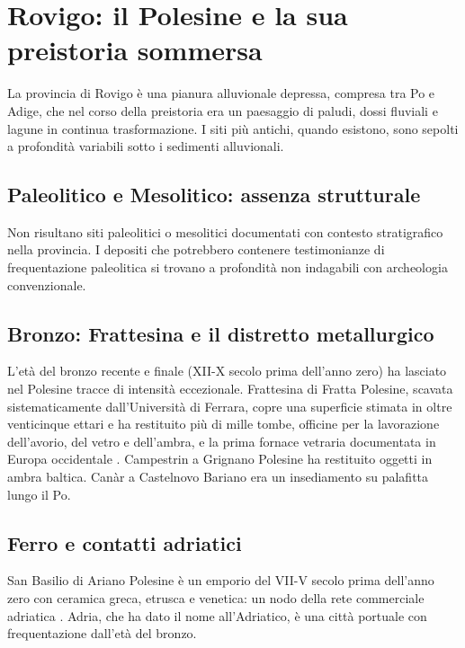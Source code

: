 \section{Rovigo: il Polesine e la sua preistoria sommersa}

La provincia di Rovigo è una pianura alluvionale depressa, compresa tra Po e Adige, che nel corso della preistoria era un paesaggio di paludi, dossi fluviali e lagune in continua trasformazione. I siti più antichi, quando esistono, sono sepolti a profondità variabili sotto i sedimenti alluvionali.

\subsection{Paleolitico e Mesolitico: assenza strutturale}

Non risultano siti paleolitici o mesolitici documentati con contesto stratigrafico nella provincia. I depositi che potrebbero contenere testimonianze di frequentazione paleolitica si trovano a profondità non indagabili con archeologia convenzionale.

\subsection{Bronzo: Frattesina e il distretto metallurgico}

L'età del bronzo recente e finale (XII-X secolo prima dell'anno zero) ha lasciato nel Polesine tracce di intensità eccezionale. Frattesina di Fratta Polesine, scavata sistematicamente dall'Università di Ferrara, copre una superficie stimata in oltre venticinque ettari e ha restituito più di mille tombe, officine per la lavorazione dell'avorio, del vetro e dell'ambra, e la prima fornace vetraria documentata in Europa occidentale \citep{bietti_sestieri1996}. Campestrin a Grignano Polesine ha restituito oggetti in ambra baltica. Canàr a Castelnovo Bariano era un insediamento su palafitta lungo il Po.

\subsection{Ferro e contatti adriatici}

San Basilio di Ariano Polesine è un emporio del VII-V secolo prima dell'anno zero con ceramica greca, etrusca e venetica: un nodo della rete commerciale adriatica \citep{bonomi1991}. Adria, che ha dato il nome all'Adriatico, è una città portuale con frequentazione dall'età del bronzo.

